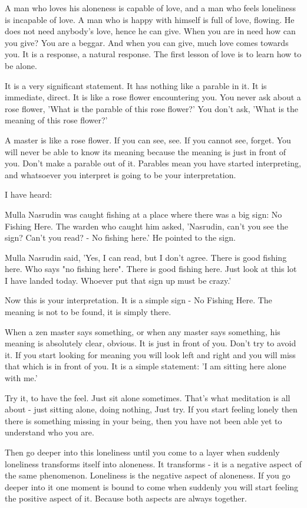 A man who loves his aloneness is capable of love, and a man who feels loneliness is incapable of love. A man who is happy with himself is full of love, flowing. He does not need anybody's love, hence he can give. When you are in need how can you give? You are a beggar. And when you can give, much love comes towards you. It is a response, a natural response. The first lesson of love is to learn how to be alone.

It is a very significant statement. It has nothing like a parable in it. It is immediate, direct. It is like a rose flower encountering you. You never ask about a rose flower, 'What is the parable of this rose flower?' You don't ask, 'What is the meaning of this rose flower?'

A master is like a rose flower. If you can see, see. If you cannot see, forget. You will never be able to know its meaning because the meaning is just in front of you. Don't make a parable out of it. Parables mean you have started interpreting, and whatsoever you interpret is going to be your interpretation.

I have heard:

Mulla Nasrudin was caught fishing at a place where there was a big sign: No Fishing Here. The warden who caught him asked, 'Nasrudin, can't you see the sign? Can't you read? - No fishing here.' He pointed to the sign.

Mulla Nasrudin said, 'Yes, I can read, but I don't agree. There is good fishing here. Who says "no fishing here". There is good fishing here. Just look at this lot I have landed today. Whoever put that sign up must be crazy.'

Now this is your interpretation. It is a simple sign - No Fishing Here. The meaning is not to be found, it is simply there.

When a zen master says something, or when any master says something, his meaning is absolutely clear, obvious. It is just in front of you. Don't try to avoid it. If you start looking for meaning you will look left and right and you will miss that which is in front of you. It is a simple statement: 'I am sitting here alone with me.'

Try it, to have the feel. Just sit alone sometimes. That's what meditation is all about - just sitting alone, doing nothing, Just try. If you start feeling lonely then there is something missing in your being, then you have not been able yet to understand who you are.

Then go deeper into this loneliness until you come to a layer when suddenly loneliness transforms itself into aloneness. It transforms - it is a negative aspect of the same phenomenon. Loneliness is the negative aspect of aloneness. If you go deeper into it one moment is bound to come when suddenly you will start feeling the positive aspect of it. Because both aspects are always together.

